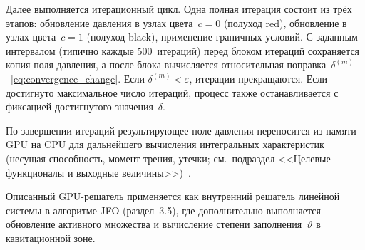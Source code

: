 Далее выполняется итерационный цикл. Одна полная итерация состоит из трёх этапов: обновление давления в узлах цвета~$c = 0$ (полуход red), обновление в узлах цвета~$c = 1$ (полуход black), применение граничных условий. С заданным интервалом (типично каждые 500~итераций) перед блоком итераций сохраняется копия поля давления, а после блока вычисляется относительная поправка~$\delta^{(m)}$~\eqref{eq:convergence_change}. Если $\delta^{(m)} < \varepsilon$, итерации прекращаются. Если достигнуто максимальное число итераций, процесс также останавливается с фиксацией достигнутого значения~$\delta$.

По завершении итераций результирующее поле давления переносится из памяти GPU на CPU для дальнейшего вычисления интегральных характеристик (несущая способность, момент трения, утечки; см.\ подраздел <<Целевые функционалы и выходные величины>>)~\cite{ansys2013}.

Описанный GPU-решатель применяется как внутренний решатель линейной системы в алгоритме JFO (раздел~3.5), где дополнительно выполняется обновление активного множества и вычисление степени заполнения~$\vartheta$ в кавитационной зоне.

